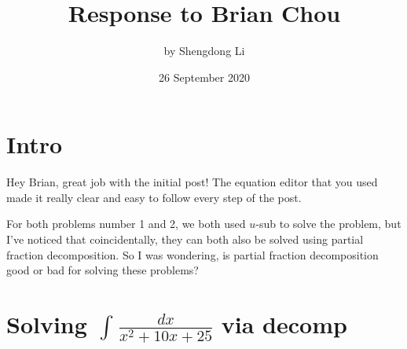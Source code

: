 \documentclass[12pt]{article}
\begin{document}
\title{Response to Brian Chou}
\author{by Shengdong Li}
\date{26 September 2020}
\maketitle

\section{Intro}
Hey Brian, great job with the initial post! The equation editor that you used made it really clear and easy to follow every step of the post.

For both problems number 1 and 2, we both used $u$-sub to solve the problem, but I've noticed that coincidentally, they can both also be solved using partial fraction decomposition. So I was wondering, is partial fraction decomposition good or bad for solving these problems?

\section{Solving $\int_{ }^{ }\frac{dx}{x^{2}+10x+25}$ via decomp}
\end{document}
